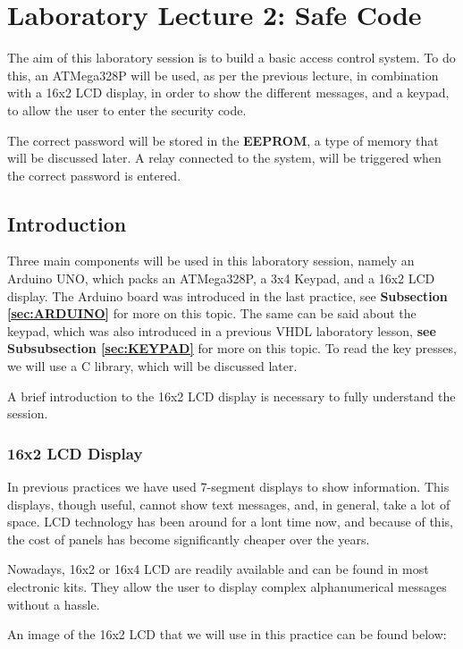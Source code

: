 \section{Laboratory Lecture 2: Safe Code}

The aim of this laboratory session is to build a basic access control system. To do this, an ATMega328P will be used, as per the previous lecture, in combination with a 16x2 LCD display, in order to show the different messages, and a keypad, to allow the user to enter the security code.\medskip

The correct password will be stored in the \textbf{EEPROM}, a type of memory that will be discussed later. A relay connected to the system, will be triggered when the correct password is entered.

\subsection{Introduction}

Three main components will be used in this laboratory session, namely an Arduino UNO, which packs an ATMega328P, a 3x4 Keypad, and a 16x2 LCD display. The Arduino board was introduced in the last practice, see \textbf{Subsection \ref{sec:ARDUINO}} for more on this topic. The same can be said about the keypad, which was also introduced in a previous VHDL laboratory lesson, \textbf{see Subsubsection \ref{sec:KEYPAD}} for more on this topic. To read the key presses, we will use a C library, which will be discussed later.\medskip

A brief introduction to the 16x2 LCD display is necessary to fully understand the session.

\subsubsection{16x2 LCD Display}

In previous practices we have used 7-segment displays to show information. This displays, though useful, cannot show text messages, and, in general, take a lot of space. LCD technology has been around for a lont time now, and because of this, the cost of panels has become significantly cheaper over the years. \medskip

Nowadays, 16x2 or 16x4 LCD are readily available and can be found in most electronic kits. They allow the user to display complex alphanumerical messages without a hassle.\medskip

An image of the 16x2 LCD that we will use in this practice can be found below:

